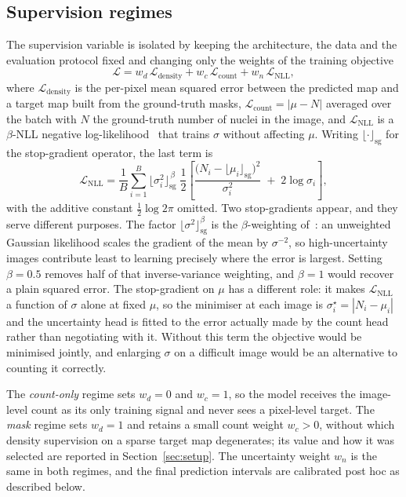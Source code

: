 \documentclass[preprint,12pt]{elsarticle}
\begin{document}
\subsection{Supervision regimes}
The supervision variable is isolated by keeping the architecture, the data and the evaluation protocol fixed
and changing only the weights of the training objective
\begin{equation}
\mathcal{L} = w_d\,\mathcal{L}_{\text{density}} + w_c\,\mathcal{L}_{\text{count}}
+ w_{n}\,\mathcal{L}_{\text{NLL}},
\end{equation}
where $\mathcal{L}_{\text{density}}$ is the per-pixel mean squared error between the predicted map and a target
map built from the ground-truth masks, $\mathcal{L}_{\text{count}} = |\mu - N|$ averaged over the batch with
$N$ the ground-truth number of nuclei in the image, and $\mathcal{L}_{\text{NLL}}$ is a $\beta$-NLL negative
log-likelihood~\cite{bnll} that trains $\sigma$ without affecting $\mu$. Writing $\lfloor\cdot\rfloor_{\text{sg}}$
for the stop-gradient operator, the last term is
\begin{equation}
\mathcal{L}_{\text{NLL}}
= \frac{1}{B}\sum_{i=1}^{B}
\big\lfloor \sigma_i^{2}\big\rfloor_{\text{sg}}^{\,\beta}\;
\frac{1}{2}\!\left[
\frac{\big(N_i - \lfloor\mu_i\rfloor_{\text{sg}}\big)^{2}}{\sigma_i^{2}}
\;+\; 2\log\sigma_i
\right],
\end{equation}
with the additive constant $\tfrac{1}{2}\log 2\pi$ omitted. Two stop-gradients appear, and they serve different
purposes. The factor $\lfloor\sigma^{2}\rfloor_{\text{sg}}^{\beta}$ is the $\beta$-weighting of~\cite{bnll}: an
unweighted Gaussian likelihood scales the gradient of the mean by $\sigma^{-2}$, so high-uncertainty images
contribute least to learning precisely where the error is largest. Setting $\beta = 0.5$ removes half of that
inverse-variance weighting, and $\beta = 1$ would recover a plain squared error. The stop-gradient on $\mu$ has
a different role: it makes $\mathcal{L}_{\text{NLL}}$ a function of $\sigma$ alone at fixed $\mu$, so the
minimiser at each image is $\sigma_i^{\star} = |N_i - \mu_i|$ and the uncertainty head is fitted to the error
actually made by the count head rather than negotiating with it. Without this term the objective would be
minimised jointly, and enlarging $\sigma$ on a difficult image would be an alternative to counting it
correctly.

The \emph{count-only} regime sets $w_d = 0$ and $w_c = 1$, so the model receives the image-level count as its
only training signal and never sees a pixel-level target. The \emph{mask} regime sets $w_d = 1$ and retains a
small count weight $w_c > 0$, without which density supervision on a sparse target map degenerates; its value
and how it was selected are reported in Section~\ref{sec:setup}. The uncertainty weight $w_n$ is the same in
both regimes, and the final prediction intervals are calibrated post hoc as described below.
\end{document}
